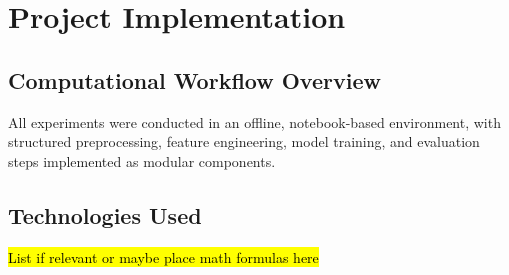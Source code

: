 
\section{Project Implementation}

\begin{comment}
\begin{itemize}
    \item System Architecture: For technical projects, outline the architecture or structure of your system.
    \item Development Process: Discuss the steps you took to build, test, and deploy your solution.
    \item Technologies Used: Mention programming languages, frameworks, or tools employed.
\end{itemize}
\end{comment}







\subsection{Computational Workflow Overview}

All experiments were conducted in an offline, notebook-based environment, with structured preprocessing, feature engineering, model training, and evaluation steps implemented as modular components. %

\subsection{Technologies Used}

\hl{List if relevant or maybe place math formulas here}

\begin{comment}
Key libraries used include:
\begin{itemize}
    \item \textbf{pandas} and \textbf{NumPy} for data manipulation and numerical computations;
    \item \textbf{scikit-learn} for classical machine learning models (e.g., Logistic Regression, Random Forest) and preprocessing utilities (e.g., SMOTE, train-test split);
    \item \textbf{xgboost} for gradient boosting classifiers;
    \item \textbf{imbalanced-learn} for handling class imbalance using ensemble methods and synthetic oversampling;
    \item \textbf{TensorFlow} and \textbf{Keras} for building, training, and tuning Long Short-Term Memory (LSTM) networks.
\end{itemize}
\end{comment}